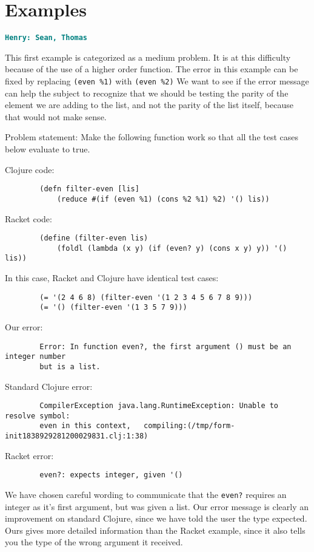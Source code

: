 \documentclass[12pt]{article}
\newcommand{\comment}[1]{{\bf \tt  {#1}}}
\newcommand{\hfcomment}[1]{\textcolor{Teal}{\comment{Henry: {#1}}}}
\begin{document}
\section{Examples}\label{sec:examples}
	\hfcomment{Sean, Thomas}
	
	This first example is categorized as a medium problem. 
	It is at this difficulty because of the use of a higher order function.
	The error in this example can be fixed by replacing \texttt{(even \%1)} with \texttt{(even \%2)} 
	We want to see if the error message can help the subject to recognize that we should be testing the parity of the element we are adding to the list, and not the parity of the list itself, because that would not make sense. 
	
	Problem statement:
		Make the following function work so that all the test cases below evaluate to true.
	
	Clojure code:
\begin{verbatim}
		(defn filter-even [lis] 
			(reduce #(if (even %1) (cons %2 %1) %2) '() lis))
\end{verbatim}
	Racket code:
\begin{verbatim}
		(define (filter-even lis) 
			(foldl (lambda (x y) (if (even? y) (cons x y) y)) '() lis))
\end{verbatim}
	In this case, Racket and Clojure have identical test cases: 

\begin{verbatim}
		(= '(2 4 6 8) (filter-even '(1 2 3 4 5 6 7 8 9)))
		(= '() (filter-even '(1 3 5 7 9)))
\end{verbatim}

	Our error:
\begin{verbatim}
		Error: In function even?, the first argument () must be an integer number 
		but is a list.
\end{verbatim}

	Standard Clojure error:
\begin{verbatim}
		CompilerException java.lang.RuntimeException: Unable to resolve symbol: 
		even in this context, 	compiling:(/tmp/form-init1838929281200029831.clj:1:38) 
\end{verbatim}

	Racket error:
\begin{verbatim}
		even?: expects integer, given '()
\end{verbatim}

	We have chosen careful wording to communicate that the \texttt{even?} requires an integer as it's first argument, but was given a list. 
	Our error message is clearly an improvement on standard Clojure, since we have told the user the type expected. 
	Ours gives more detailed information than the Racket example, since it also tells you the type of the wrong argument it received.
	
\end{document}

